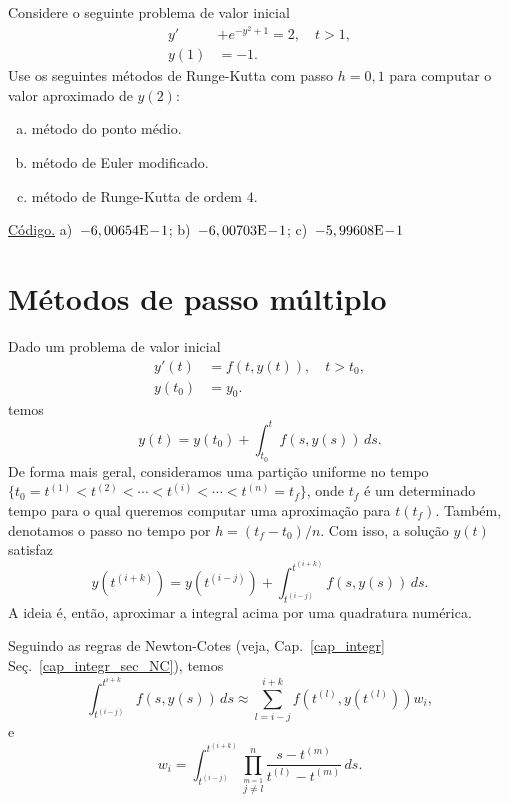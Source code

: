 \begin{exer}
  Considere o seguinte problema de valor inicial
  \begin{align}
    y' &+ e^{-y^2+1} = 2,\quad t>1,\\
    y(1) &= -1.
  \end{align}
Use os seguintes métodos de Runge-Kutta com passo $h=0,1$ para computar o valor aproximado de $y(2)$:
\begin{enumerate}[a)]
\item método do ponto médio.
\item método de Euler modificado.
\item método de Runge-Kutta de ordem $4$.
\end{enumerate}
\end{exer}
\begin{resp}
  \ifisoctave 
  \href{https://github.com/phkonzen/notas/blob/master/src/MatematicaNumerica/cap_integr/dados/exer_RK_pvi1/exer_RK_pvi1.m}{Código.} 
  \fi
  a)~$-6,00654\mathrm{E}\!-\!1$; b)~$-6,00703\mathrm{E}\!-\!1$; c)~$-5,99608\mathrm{E}\!-\!1$
\end{resp}

\section{Métodos de passo múltiplo}\label{cap_pvi_sec_passo_mult}

Dado um problema de valor inicial
\begin{align}
  y'(t) &= f(t,y(t)),\quad t>t_0,\\
  y(t_0) &= y_0.
\end{align}
temos
\begin{equation}
  y(t) = y(t_0) + \int_{t_0}^t f(s,y(s))\,ds.
\end{equation}
De forma mais geral, consideramos uma partição uniforme no tempo $\{t_0=t^{(1)} < t^{(2)} < \cdots < t^{(i)} < \cdots < t^{(n)}=t_f\}$, onde $t_f$ é um determinado tempo para o qual queremos computar uma aproximação para $t(t_f)$. Também, denotamos o passo no tempo por $h=(t_f-t_0)/n$. Com isso, a solução $y(t)$ satisfaz
\begin{equation}
  y\left(t^{(i+k)}\right) = y\left(t^{(i-j)}\right) + \int_{t^{(i-j)}}^{t^{(i+k)}} f(s,y(s))\,ds.
\end{equation}
A ideia é, então, aproximar a integral acima por uma quadratura numérica.

Seguindo as regras de Newton-Cotes (veja, Cap.~\ref{cap_integr} Seç.~\ref{cap_integr_sec_NC}), temos
\begin{equation}
  \int_{t^{(i-j)}}^{t^{i+k}} f(s,y(s))\,ds \approx \sum_{l=i-j}^{i+k} f\left(t^{(l)},y(t^{(l)})\right)w_i,
\end{equation}
e
\begin{equation}
  w_i = \int_{t^{(i-j)}}^{t^{(i+k)}} \prod_{\overset{m=1}{j\neq l}}^n \frac{s-t^{(m)}}{t^{(l)}-t^{(m)}}\,ds.
\end{equation}